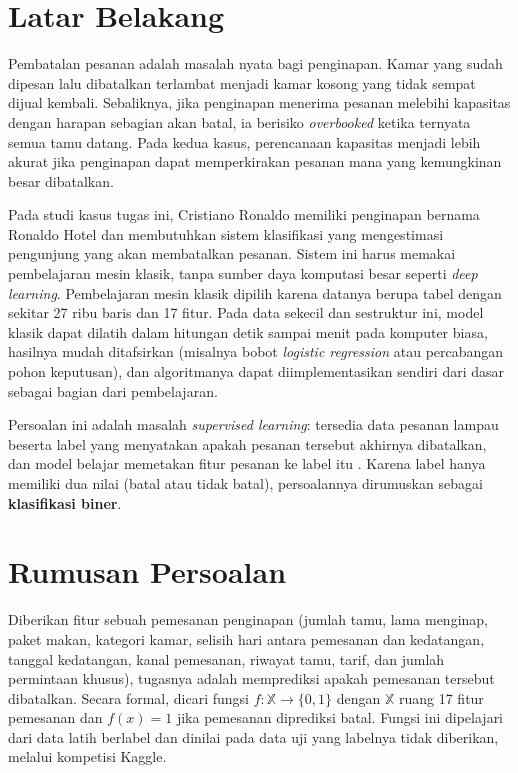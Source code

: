 \section{Latar Belakang}
\label{sec:latar-belakang}

Pembatalan pesanan adalah masalah nyata bagi penginapan. Kamar yang sudah dipesan lalu dibatalkan terlambat menjadi kamar kosong yang tidak sempat dijual kembali. Sebaliknya, jika penginapan menerima pesanan melebihi kapasitas dengan harapan sebagian akan batal, ia berisiko \textit{overbooked} ketika ternyata semua tamu datang. Pada kedua kasus, perencanaan kapasitas menjadi lebih akurat jika penginapan dapat memperkirakan pesanan mana yang kemungkinan besar dibatalkan.

Pada studi kasus tugas ini, Cristiano Ronaldo memiliki penginapan bernama Ronaldo Hotel\texttrademark{} dan membutuhkan sistem klasifikasi yang mengestimasi pengunjung yang akan membatalkan pesanan. Sistem ini harus memakai pembelajaran mesin klasik, tanpa sumber daya komputasi besar seperti \textit{deep learning}. Pembelajaran mesin klasik dipilih karena datanya berupa tabel dengan sekitar 27 ribu baris dan 17 fitur. Pada data sekecil dan sestruktur ini, model klasik dapat dilatih dalam hitungan detik sampai menit pada komputer biasa, hasilnya mudah ditafsirkan (misalnya bobot \textit{logistic regression} atau percabangan pohon keputusan), dan algoritmanya dapat diimplementasikan sendiri dari dasar sebagai bagian dari pembelajaran.

Persoalan ini adalah masalah \textit{supervised learning}: tersedia data pesanan lampau beserta label yang menyatakan apakah pesanan tersebut akhirnya dibatalkan, dan model belajar memetakan fitur pesanan ke label itu \cite{slide-intro}. Karena label hanya memiliki dua nilai (batal atau tidak batal), persoalannya dirumuskan sebagai \textbf{klasifikasi biner}.

\section{Rumusan Persoalan}
\label{sec:rumusan-persoalan}

Diberikan fitur sebuah pemesanan penginapan (jumlah tamu, lama menginap, paket makan, kategori kamar, selisih hari antara pemesanan dan kedatangan, tanggal kedatangan, kanal pemesanan, riwayat tamu, tarif, dan jumlah permintaan khusus), tugasnya adalah memprediksi apakah pemesanan tersebut dibatalkan. Secara formal, dicari fungsi $f : \mathbb{X} \to \{0, 1\}$ dengan $\mathbb{X}$ ruang 17 fitur pemesanan dan $f(x) = 1$ jika pemesanan diprediksi batal. Fungsi ini dipelajari dari data latih berlabel dan dinilai pada data uji yang labelnya tidak diberikan, melalui kompetisi Kaggle.

